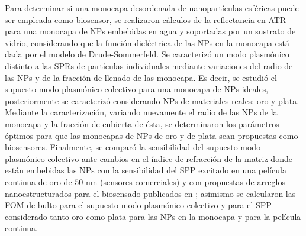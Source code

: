 Para determinar si una monocapa desordenada de nanopartículas esféricas puede ser empleada como biosensor, se realizaron cálculos de la reflectancia en ATR para una monocapa de NPs embebidas en agua y soportadas por un sustrato de vidrio, considerando que la función dieléctrica de las NPs en la monocapa está dada por el modelo de Drude-Sommerfeld. Se caracterizó un modo plasmónico distinto a las SPRs de partículas individuales mediante variaciones del radio de las NPs y de la fracción de llenado de las monocapa. Es decir, se estudió el supuesto modo plasmónico colectivo para una monocapa de NPs ideales, posteriormente se caracterizó considerando NPs de materiales reales: oro y plata. Mediante la caracterización, variando nuevamente el radio de las NPs de la monocapa y la fracción de cubierta de ésta, se determinaron los parámetros óptimos para que las monocapas de NPs de oro y de plata sean propuestas como biosensores. Finalmente, se comparó la sensibilidad del supuesto modo plasmónico colectivo ante cambios en el índice de refracción de la matriz donde están embebidas las NPs con la sensibilidad del SPP excitado en una película continua de oro de $50$ nm (sensores comerciales) y con propuestas de arreglos nanoestructurados para el biosensado publicados en \cite{kabashin2009plasmonic,danilov2018ultra,svedendahl2009refractometric}; asimismo se calcularon las FOM de bulto para el supuesto modo plasmónico colectivo y para el SPP considerado tanto oro como plata para las NPs en la monocapa y para la película continua.

